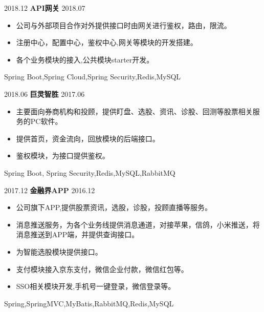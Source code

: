 %
%
%
%
%


\begin{projects}

  \project
    {2018.12} {\textbf{API网关}}
    {2018.07} {
                      \begin{itemize}
                        \item 公司与外部项目合作对外提供接口时由网关进行鉴权，路由，限流。
                        \item 注册中心，配置中心，鉴权中心,网关等模块的开发搭建。
                        \item 各个业务模块的接入,公共模块starter开发。
                      \end{itemize}
                    }
                    {Spring Boot,Spring Cloud,Spring Security,Redis,MySQL}
  \emptySeparator


  \project
    {2018.06}   {\textbf{巨灵智胜}}
    {2017.06} {
                      \begin{itemize}
                        \item 主要面向券商机构和投顾，提供盯盘、选股、资讯、诊股、回测等股票相关服务的PC软件。
                        \item 提供首页，资金流向，回放模块的后端接口。
                        \item 鉴权模块，为接口提供鉴权。
                      \end{itemize}
                    }
                    {Spring Boot, Spring Security,Redis,MySQL,RabbitMQ}
  \emptySeparator

  \project
    {2017.12}   {\textbf{金融界APP}}
    {2016.12} {
                      \begin{itemize}
                        \item 公司旗下APP,提供股票资讯，选股，诊股，投顾直播等服务。
                        \item 消息推送服务，为各个业务线提供消息通道，对接苹果，信鸽，小米推送，将消息推送到APP端，并提供查询接口。
                        \item 为智能选股模块提供接口。
                        \item 支付模块接入京东支付，微信企业付款，微信红包等。
                        \item SSO相关模块开发,手机号一键登录，微信登录等。
                      \end{itemize}
                    }
                    {Spring,SpringMVC,MyBatis,RabbitMQ,Redis,MySQL}
  \emptySeparator


\end{projects}
